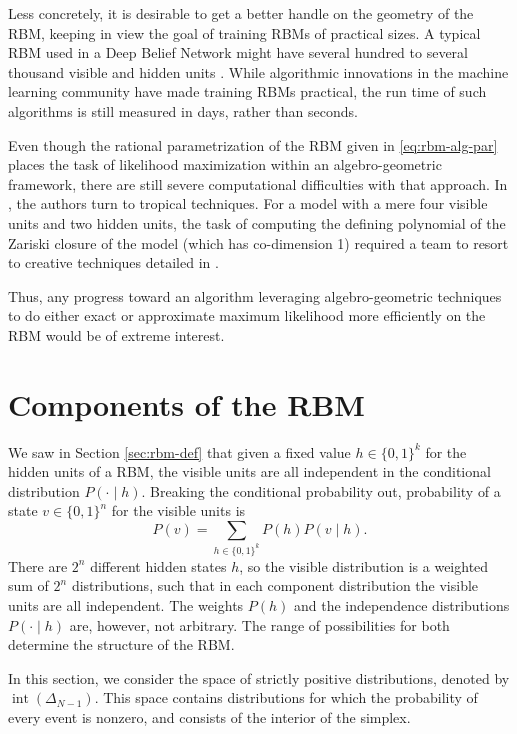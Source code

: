 \documentclass[11pt,titlepage]{article}
\DeclareMathOperator{\intr}{int}
\numberwithin{equation}{section}
\begin{document}
    Less concretely, it is desirable to get a better handle on the geometry of
    the RBM, keeping in view the goal of training RBMs of practical sizes.  A
    typical RBM used in a Deep Belief Network might have several hundred to
    several thousand visible and hidden units \cite{Hin07}.  While algorithmic
    innovations in the machine learning community have made training RBMs
    practical, the run time of such algorithms is still measured in days, rather
    than seconds.
    
    Even though the rational parametrization of the RBM given in
    \eqref{eq:rbm-alg-par} places the task of likelihood maximization within an
    algebro-geometric framework, there are still severe computational
    difficulties with that approach.  In \cite{CMS09}, the authors turn to
    tropical techniques.  For a model with a mere four visible units and two
    hidden units, the task of computing the defining polynomial of the Zariski
    closure of the model (which has co-dimension 1) required a team to resort
    to creative techniques detailed in \cite{CTY10}.  

    Thus, any progress toward an algorithm leveraging algebro-geometric
    techniques to do either exact or approximate maximum likelihood
    more efficiently on the RBM would be of extreme interest.


\section{Components of the RBM}

    We saw in Section \ref{sec:rbm-def} that given a fixed value $h \in
    \{0,1\}^k$ for the hidden units of a RBM, the visible units are all
    independent in the conditional distribution $P( \cdot\mid h )$.  Breaking
    the conditional probability out, probability of a state $v \in \{0,1\}^n$
    for the visible units is
    \[
        P( v ) = \sum_{h \in \{0,1\}^k} P( h ) P( v \mid h ).
    \]
    There are $2^n$ different hidden states $h$, so the visible distribution is
    a weighted sum of $2^n$ distributions, such that in each component
    distribution the visible units are all independent.  The weights $P(h)$ and
    the independence distributions $P(\cdot \mid h)$ are, however, not
    arbitrary.  The range of possibilities for both determine the structure of
    the RBM.

    In this section, we consider the space of strictly positive distributions,
    denoted by $\intr(\Delta_{N-1})$.  This space contains distributions for
    which the probability of every event is nonzero, and consists of the
    interior of the simplex.
\end{document}

